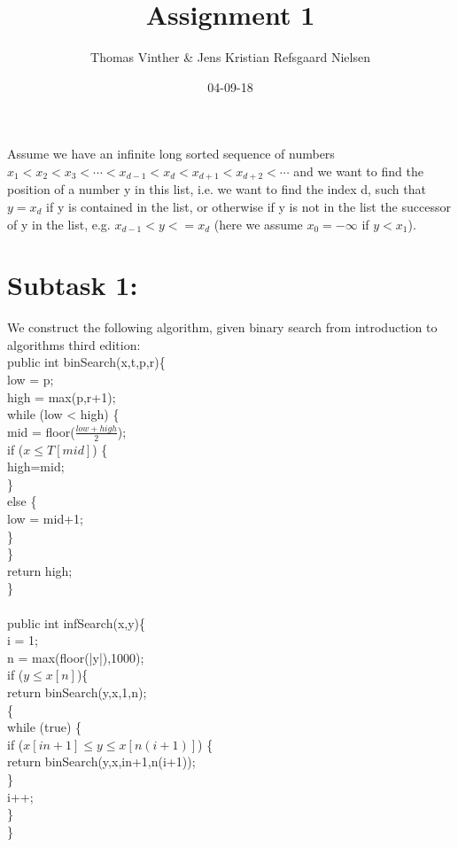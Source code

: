 \documentclass{article}
\theoremstyle{remark}
\numberwithin{equation}{section}
\begin{document}
	\author{Thomas Vinther \& Jens Kristian Refsgaard Nielsen}
	\title{Assignment 1}
	\date{04-09-18}
	\maketitle
\section*{}
Assume we have an infinite long sorted sequence of numbers $x_1 < x_2 < x_3 < \cdots < x_{d-1} < x_d < x_{d+1} < x_{d+2} < \cdots $ and we want to find the position of a number y in this list, i.e. we want to find the index d, such that $y = x_d$ if y is contained in the list, or otherwise if y is not in the list the successor of y in the list, e.g. $x_{d-1} < y <= x_d$ (here we assume $x_0 = -\infty$ if $y < x_1$).
\section*{Subtask 1:}
We construct the following algorithm, given binary search from introduction to algorithms third edition:
\\public int binSearch(x,t,p,r)\{
\\\indent low = p;
\\\indent high = max(p,r+1);
\\\indent while (low < high) \{
\\\indent\indent mid = floor($\frac{low+high}{2}$);
\\\indent\indent if ($x\leq T[mid]$) \{
\\\indent\indent\indent high=mid;
\\\indent\indent\}
\\\indent\indent else \{
\\\indent\indent\indent low = mid+1; 
\\\indent\indent\}
\\\indent \}
\\\indent return high;
\\\}
\\
\\public int infSearch(x,y)\{
\\\indent i = 1;
\\\indent n = max(floor(|y|),1000);
\\\indent if ($y\leq x[n]$)\{
\\\indent\indent return binSearch(y,x,1,n);
\\\indent\{
\\\indent while (true) \{
\\\indent\indent if ($x[in+1] \leq y \leq x[n(i+1)]$) \{
\\\indent\indent\indent return binSearch(y,x,in+1,n(i+1));
\\\indent\indent \}
\\\indent\indent i++;
\\\indent \}
\\\}
\end{document}
